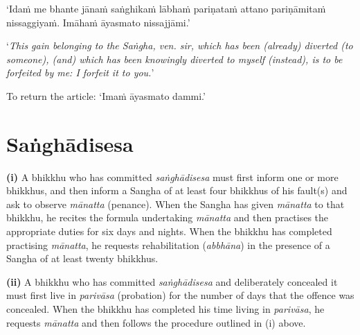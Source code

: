 ‘Idaṁ me bhante jānaṁ saṅghikaṁ lābhaṁ pariṇataṁ attano pariṇāmitaṁ nissaggiyaṁ.
Imāhaṁ āyasmato nissajjāmi.’

‘\emph{This gain belonging to the Saṅgha, ven. sir, which has been (already)
  diverted (to someone), (and) which has been knowingly diverted to myself
  (instead), is to be forfeited by me: I forfeit it to you.}’


To return the article: ‘Imaṁ āyasmato dammi.’


\ifhandbookedition
\clearpage
\fi

\section{Saṅghādisesa}

\textbf{(i)} A bhikkhu who has committed \emph{saṅghādisesa} must first inform
one or more bhikkhus, and then inform a Sangha of at least four bhikkhus of his
fault(s) and ask to observe \emph{mānatta} (penance). When the Sangha has given
\emph{mānatta} to that bhikkhu, he recites the formula undertaking
\emph{mānatta} and then practises the appropriate duties for six days and
nights. When the bhikkhu has completed practising \emph{mānatta}, he requests
rehabilitation (\emph{abbhāna}) in the presence of a Sangha of at least twenty
bhikkhus.

\textbf{(ii)} A bhikkhu who has committed \emph{saṅghādisesa} and deliberately
concealed it must first live in \emph{parivāsa} (probation) for the number of
days that the offence was concealed. When the bhikkhu has completed his time
living in \emph{parivāsa}, he requests \emph{mānatta} and then follows the
procedure outlined in (i) above.

